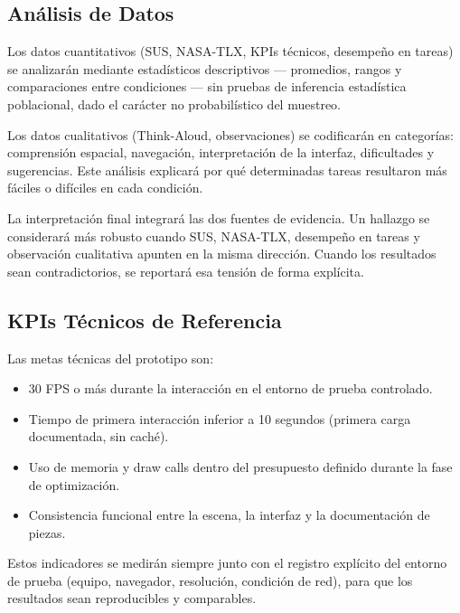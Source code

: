 \subsection{An\'alisis de Datos}

Los datos cuantitativos (SUS, NASA-TLX, KPIs t\'ecnicos, desempe\~no en tareas) se analizar\'an mediante estad\'isticos descriptivos — promedios, rangos y comparaciones entre condiciones — sin pruebas de inferencia estad\'istica poblacional, dado el car\'acter no probabil\'istico del muestreo.

Los datos cualitativos (Think-Aloud, observaciones) se codificar\'an en categor\'ias: comprensi\'on espacial, navegaci\'on, interpretaci\'on de la interfaz, dificultades y sugerencias. Este an\'alisis explicar\'a por qu\'e determinadas tareas resultaron m\'as f\'aciles o dif\'iciles en cada condici\'on.

La interpretaci\'on final integrar\'a las dos fuentes de evidencia. Un hallazgo se considerar\'a m\'as robusto cuando SUS, NASA-TLX, desempe\~no en tareas y observaci\'on cualitativa apunten en la misma direcci\'on. Cuando los resultados sean contradictorios, se reportar\'a esa tensi\'on de forma expl\'icita.

\subsection{KPIs T\'ecnicos de Referencia}

Las metas t\'ecnicas del prototipo son:

\begin{itemize}
    \item 30 FPS o m\'as durante la interacci\'on en el entorno de prueba controlado.
    \item Tiempo de primera interacci\'on inferior a 10 segundos (primera carga documentada, sin cach\'e).
    \item Uso de memoria y draw calls dentro del presupuesto definido durante la fase de optimizaci\'on.
    \item Consistencia funcional entre la escena, la interfaz y la documentaci\'on de piezas.
\end{itemize}

Estos indicadores se medir\'an siempre junto con el registro expl\'icito del entorno de prueba (equipo, navegador, resoluci\'on, condici\'on de red), para que los resultados sean reproducibles y comparables.

\newpage

